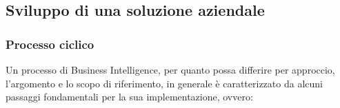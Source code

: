 \subsection{Sviluppo di una soluzione aziendale}

\subsubsection{Processo ciclico}
Un processo di Business Intelligence, per quanto possa differire per approccio, l'argomento e lo scopo di riferimento, in generale è caratterizzato da alcuni passaggi fondamentali per la sua implementazione, ovvero:\cite{citeseerx_bi_process} 

